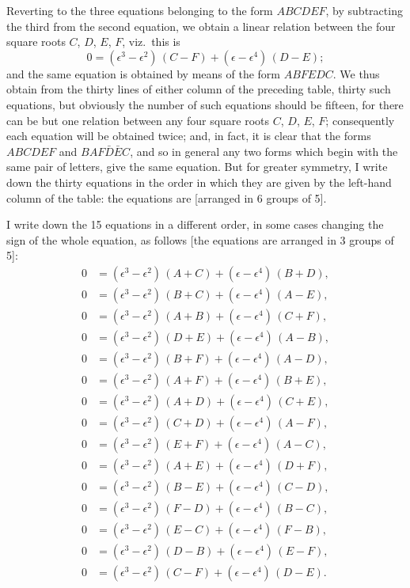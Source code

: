 \documentclass[12pt,a4paper]{article}
\theoremstyle{definition}
\begin{document}
Reverting to the three equations belonging to the form $ABCDEF$, by subtracting
the third from the second equation, we obtain a linear relation between the four
square roots $C$, $D$, $E$, $F$, viz.\ this is
\[
0 = (\epsilon^3 - \epsilon^2)\, (C - F) + (\epsilon - \epsilon^4)\, (D - E);
\]
and the same equation is obtained by means of the form $ABFEDC$. We thus obtain
from the thirty lines of either column of the preceding table, thirty such equations,
but obviously the number of such equations should be fifteen, for there can be but
one relation between any four square roots $C$, $D$, $E$, $F$; consequently each equation
will be obtained twice; and, in fact, it is clear that the forms $ABCDEF$ and
$BAF\bar{D}\bar{E}C$, and so in general any two forms which begin with the same pair of
letters, give the same equation. But for greater symmetry, I write down the thirty
equations in the order in which they are given by the left-hand column of the
table: the equations are [arranged in 6 groups of 5].

I write down the 15 equations in a different order, in some cases changing the
sign of the whole equation, as follows [the equations are arranged in 3 groups of 5]:
\begin{align*}
0 &= (\epsilon^3 - \epsilon^2)\, (A + C) + (\epsilon - \epsilon^4)\, (B + D),\\
0 &= (\epsilon^3 - \epsilon^2)\, (B + C) + (\epsilon - \epsilon^4)\, (A - E),\\
0 &= (\epsilon^3 - \epsilon^2)\, (A + B) + (\epsilon - \epsilon^4)\, (C + F),\\
0 &= (\epsilon^3 - \epsilon^2)\, (D + E) + (\epsilon - \epsilon^4)\, (A - B),\\
0 &= (\epsilon^3 - \epsilon^2)\, (B + F) + (\epsilon - \epsilon^4)\, (A - D),\\
0 &= (\epsilon^3 - \epsilon^2)\, (A + F) + (\epsilon - \epsilon^4)\, (B + E),\\
0 &= (\epsilon^3 - \epsilon^2)\, (A + D) + (\epsilon - \epsilon^4)\, (C + E),\\
0 &= (\epsilon^3 - \epsilon^2)\, (C + D) + (\epsilon - \epsilon^4)\, (A - F),\\
0 &= (\epsilon^3 - \epsilon^2)\, (E + F) + (\epsilon - \epsilon^4)\, (A - C),\\
0 &= (\epsilon^3 - \epsilon^2)\, (A + E) + (\epsilon - \epsilon^4)\, (D + F),\\
0 &= (\epsilon^3 - \epsilon^2)\, (B - E) + (\epsilon - \epsilon^4)\, (C - D),\\
0 &= (\epsilon^3 - \epsilon^2)\, (F - D) + (\epsilon - \epsilon^4)\, (B - C),\\
0 &= (\epsilon^3 - \epsilon^2)\, (E - C) + (\epsilon - \epsilon^4)\, (F - B),\\
0 &= (\epsilon^3 - \epsilon^2)\, (D - B) + (\epsilon - \epsilon^4)\, (E - F),\\
0 &= (\epsilon^3 - \epsilon^2)\, (C - F) + (\epsilon - \epsilon^4)\, (D - E).
\end{align*}
\end{document}
